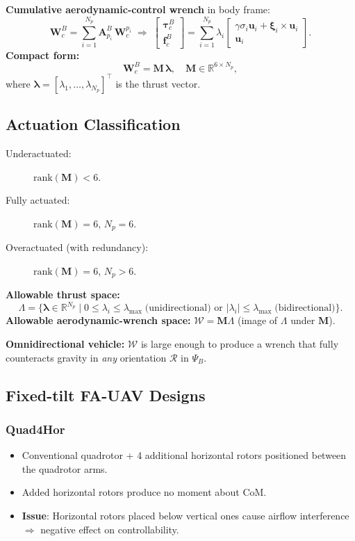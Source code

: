 \documentclass[11pt,a4paper]{article}
\newcommand{\vect}[1]{\bm{#1}}
\newcommand{\R}{\mathbb{R}}
\begin{document}
\textbf{Cumulative aerodynamic-control wrench} in body frame:
\[
\mathbf{W}_c^B = \sum_{i=1}^{N_p}\mathbf{A}_{p_i}^B\,\mathbf{W}_c^{p_i}
\;\Rightarrow\;
\begin{bmatrix}\vect{\tau}_c^B\\\vect{f}_c^B\end{bmatrix}
= \sum_{i=1}^{N_p}\lambda_i
\begin{bmatrix}\gamma\sigma_i\vect{u}_i + \vect{\xi}_i\times\vect{u}_i\\\vect{u}_i\end{bmatrix}.
\]
\textbf{Compact form:}
\[
\boxed{
\mathbf{W}_c^B = \mathbf{M}\,\vect{\lambda},
\quad
\mathbf{M}\in\R^{6\times N_p},
}
\]
where $\vect\lambda = [\lambda_1,\ldots,\lambda_{N_p}]^\top$ is the thrust vector.

\subsection{Actuation Classification}

\begin{description}
  \item[Underactuated:] $\mathrm{rank}(\mathbf{M}) < 6$.
  \item[Fully actuated:] $\mathrm{rank}(\mathbf{M}) = 6$, $N_p = 6$.
  \item[Overactuated (with redundancy):] $\mathrm{rank}(\mathbf{M}) = 6$, $N_p > 6$.
\end{description}

\textbf{Allowable thrust space:}
\[
\Lambda = \{\vect\lambda\in\R^{N_p}\mid 0\le\lambda_i\le\lambda_{\max}\;\text{(unidirectional) or }|\lambda_i|\le\lambda_{\max}\;\text{(bidirectional)}\}.
\]
\textbf{Allowable aerodynamic-wrench space:} $\mathcal{W} = \mathbf{M}\Lambda$ (image of $\Lambda$ under $\mathbf{M}$).

\textbf{Omnidirectional vehicle:} $\mathcal{W}$ is large enough to produce a wrench that fully counteracts gravity in \emph{any} orientation $\mathcal{R}$ in $\Psi_B$.

\subsection{Fixed-tilt FA-UAV Designs}

\subsubsection*{Quad4Hor}
\begin{itemize}
  \item Conventional quadrotor + 4 additional horizontal rotors positioned between the quadrotor arms.
  \item Added horizontal rotors produce no moment about CoM.
  \item \textbf{Issue}: Horizontal rotors placed below vertical ones cause airflow interference $\Rightarrow$ negative effect on controllability.
\end{itemize}
\end{document}

